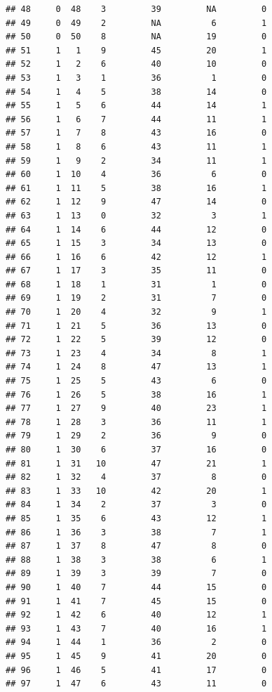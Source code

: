 \documentclass[]{book}
\begin{document}
\begin{verbatim}
## 48     0  48    3         39         NA         0
## 49     0  49    2         NA          6         1
## 50     0  50    8         NA         19         0
## 51     1   1    9         45         20         1
## 52     1   2    6         40         10         0
## 53     1   3    1         36          1         0
## 54     1   4    5         38         14         0
## 55     1   5    6         44         14         1
## 56     1   6    7         44         11         1
## 57     1   7    8         43         16         0
## 58     1   8    6         43         11         1
## 59     1   9    2         34         11         1
## 60     1  10    4         36          6         0
## 61     1  11    5         38         16         1
## 62     1  12    9         47         14         0
## 63     1  13    0         32          3         1
## 64     1  14    6         44         12         0
## 65     1  15    3         34         13         0
## 66     1  16    6         42         12         1
## 67     1  17    3         35         11         0
## 68     1  18    1         31          1         0
## 69     1  19    2         31          7         0
## 70     1  20    4         32          9         1
## 71     1  21    5         36         13         0
## 72     1  22    5         39         12         0
## 73     1  23    4         34          8         1
## 74     1  24    8         47         13         1
## 75     1  25    5         43          6         0
## 76     1  26    5         38         16         1
## 77     1  27    9         40         23         1
## 78     1  28    3         36         11         1
## 79     1  29    2         36          9         0
## 80     1  30    6         37         16         0
## 81     1  31   10         47         21         1
## 82     1  32    4         37          8         0
## 83     1  33   10         42         20         1
## 84     1  34    2         37          3         0
## 85     1  35    6         43         12         1
## 86     1  36    3         38          7         1
## 87     1  37    8         47          8         0
## 88     1  38    3         38          6         1
## 89     1  39    3         39          7         0
## 90     1  40    7         44         15         0
## 91     1  41    7         45         15         0
## 92     1  42    6         40         12         1
## 93     1  43    7         40         16         1
## 94     1  44    1         36          2         0
## 95     1  45    9         41         20         0
## 96     1  46    5         41         17         0
## 97     1  47    6         43         11         0

\end{verbatim}
\end{document}
